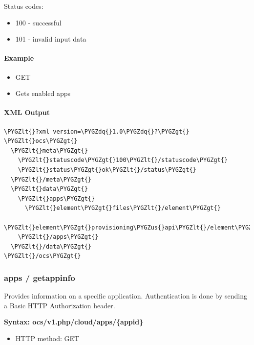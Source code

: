 \documentclass[letterpaper,10pt,english]{sphinxmanual}
\def\PYGZus{\char`\_}
\def\PYGZlt{\char`\<}
\def\PYGZgt{\char`\>}
\def\PYGZdq{\char`\"}
\begin{document}
Status codes:
\begin{itemize}
\item {} 
100 - successful

\item {} 
101 - invalid input data

\end{itemize}


\paragraph{Example}
\label{configuration_user/user_provisioning_api:id30}\begin{itemize}
\item {} 
GET 

\item {} 
Gets enabled apps

\end{itemize}


\paragraph{XML Output}
\label{configuration_user/user_provisioning_api:id31}
\begin{Verbatim}[commandchars=\\\{\}]
\PYGZlt{}?xml version=\PYGZdq{}1.0\PYGZdq{}?\PYGZgt{}
\PYGZlt{}ocs\PYGZgt{}
  \PYGZlt{}meta\PYGZgt{}
    \PYGZlt{}statuscode\PYGZgt{}100\PYGZlt{}/statuscode\PYGZgt{}
    \PYGZlt{}status\PYGZgt{}ok\PYGZlt{}/status\PYGZgt{}
  \PYGZlt{}/meta\PYGZgt{}
  \PYGZlt{}data\PYGZgt{}
    \PYGZlt{}apps\PYGZgt{}
      \PYGZlt{}element\PYGZgt{}files\PYGZlt{}/element\PYGZgt{}
      \PYGZlt{}element\PYGZgt{}provisioning\PYGZus{}api\PYGZlt{}/element\PYGZgt{}
    \PYGZlt{}/apps\PYGZgt{}
  \PYGZlt{}/data\PYGZgt{}
\PYGZlt{}/ocs\PYGZgt{}
\end{Verbatim}


\subsubsection{\textbf{apps / getappinfo}}
\label{configuration_user/user_provisioning_api:apps-getappinfo}
Provides information on a specific application. Authentication is done by
sending a Basic HTTP Authorization header.

\textbf{Syntax: ocs/v1.php/cloud/apps/\{appid\}}
\begin{itemize}
\item {} 
HTTP method: GET

\end{itemize}
\end{document}
